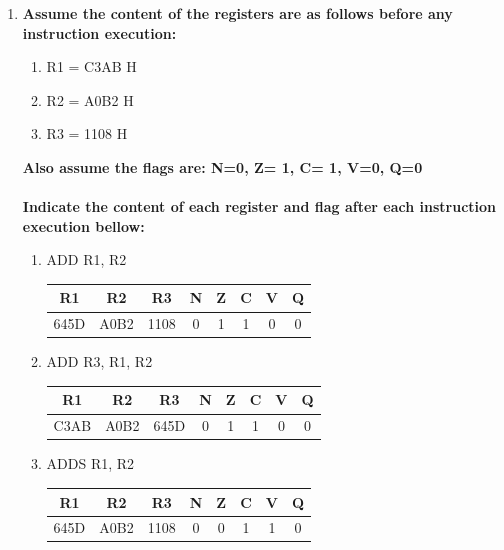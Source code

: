 \documentclass{article}
\begin{document}
\begin{enumerate}
	\item \textbf{Assume the content of the registers are as follows before any instruction execution:}
	\begin{enumerate}
	    \item R1 = C3AB H
	    \item R2 = A0B2 H
	    \item R3 = 1108 H
	\end{enumerate}
	\textbf{Also assume the flags are: N=0,  Z= 1, C= 1, V=0, Q=0}
	\\
	\\
	\textbf{Indicate the content of each register and flag after each instruction execution bellow:}
	\begin{enumerate}
	    \item ADD R1, R2
	    \begin{center}
          \begin{tabular}{ | c | c | c | c | c | c | c | c | }
            \hline
            R1 & R2 & R3 & N & Z & C & V & Q \\ \hline
            645D & A0B2 & 1108 & 0 & 1 & 1 & 0 & 0 \\ \hline
          \end{tabular}
        \end{center}
        \vspace{0.2cm}
        \item ADD R3, R1, R2
	    \begin{center}
          \begin{tabular}{ | c | c | c | c | c | c | c | c | }
            \hline
            R1 & R2 & R3 & N & Z & C & V & Q \\ \hline
            C3AB & A0B2 & 645D & 0 & 1 & 1 & 0 & 0 \\ \hline
          \end{tabular}
        \end{center}
	    \vspace{0.2cm}
	\item ADDS R1, R2
	    \begin{center}
          \begin{tabular}{ | c | c | c | c | c | c | c | c | }
            \hline
            R1 & R2 & R3 & N & Z & C & V & Q \\ \hline
            645D & A0B2 & 1108 & 0 & 0 & 1 & 1 & 0 \\ \hline
          \end{tabular}
        \end{center}
        \vspace{0.2cm}

\end{enumerate}
\end{enumerate}
\end{document}
